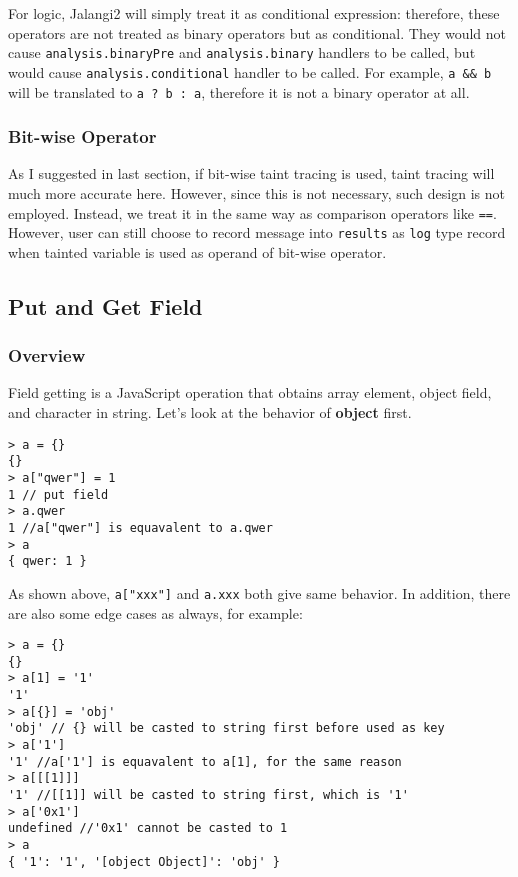 {For logic, Jalangi2 will simply treat it as conditional expression: therefore, these operators are not treated as binary operators but as conditional. They would not cause \texttt{analysis.binaryPre} and \texttt{analysis.binary} handlers to be called, but would cause \texttt{analysis.conditional} handler to be called. For example, \texttt{a && b} will be translated to \texttt{a ? b : a}, therefore it is not a binary operator at all.

\subsubsection{Bit-wise Operator}

As I suggested in last section, if bit-wise taint tracing is used, taint tracing will much more accurate here. However, since this is not necessary, such design is not employed. Instead, we treat it in the same way as comparison operators like \texttt{==}. However, user can still choose to record message into \texttt{results} as \texttt{log} type record when tainted variable is used as operand of bit-wise operator.  



\subsection{Put and Get Field}

\subsubsection{Overview}

Field getting is a JavaScript operation that obtains array element, object field, and character in string. Let's look at the behavior of \textbf{object} first.

\begin{verbatim}
> a = {}
{}
> a["qwer"] = 1
1 // put field
> a.qwer
1 //a["qwer"] is equavalent to a.qwer
> a
{ qwer: 1 }
\end{verbatim}

As shown above, \texttt{a["xxx"]} and \texttt{a.xxx} both give same behavior. In addition, there are also some edge cases as always, for example:

\begin{verbatim}
> a = {}
{}
> a[1] = '1'
'1'
> a[{}] = 'obj'
'obj' // {} will be casted to string first before used as key
> a['1']
'1' //a['1'] is equavalent to a[1], for the same reason
> a[[[1]]]
'1' //[[1]] will be casted to string first, which is '1'
> a['0x1']
undefined //'0x1' cannot be casted to 1
> a
{ '1': '1', '[object Object]': 'obj' }
\end{verbatim}

}

